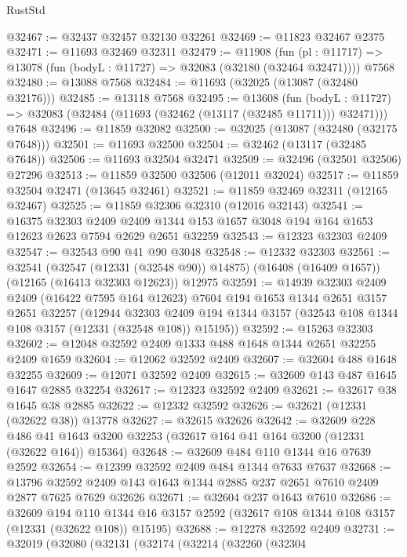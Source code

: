 \begin{lexlean}{RustStd}
\begin{coremodule}
@32467 := @32437 @32457 @32130 @32261
@32469 := @11823 @32467 @2375
@32471 := @11693 @32469 @32311
@32479 := @11908
    (fun (pl : @11717) => @13078 (fun (bodyL : @11727) => @32083 (@32180 (@32464 @32471))))
    @7568
@32480 := @13088 @7568
@32484 := @11693 (@32025 (@13087 (@32480 @32176)))
@32485 := @13118 @7568
@32495 := @13608
    (fun (bodyL : @11727) => @32083 (@32484 (@11693 (@32462 (@13117 (@32485 @11711))) @32471)))
    @7648
@32496 := @11859 @32082
@32500 := @32025 (@13087 (@32480 (@32175 @7648)))
@32501 := @11693 @32500
@32504 := @32462 (@13117 (@32485 @7648))
@32506 := @11693 @32504 @32471
@32509 := @32496 (@32501 @32506) @27296
@32513 := @11859 @32500 @32506 (@12011 @32024)
@32517 := @11859 @32504 @32471 (@13645 @32461)
@32521 := @11859 @32469 @32311 (@12165 @32467)
@32525 := @11859 @32306 @32310 (@12016 @32143)
@32541 := @16375
    @32303
    @2409
    @2409
    @1344
    @153
    @1657
    @3048
    @194
    @164
    @1653
    @12623
    @2623
    @7594
    @2629
    @2651
    @32259
@32543 := @12323 @32303 @2409
@32547 := @32543 @90 @41 @90 @3048
@32548 := @12332 @32303
@32561 := @32541
    (@32547 (@12331 (@32548 @90)) @14875)
    (@16408 (@16409 @1657))
    (@12165 (@16413 @32303 @12623))
    @12975
@32591 := @14939
    @32303
    @2409
    @2409
    (@16422 @7595 @164 @12623)
    @7604
    @194
    @1653
    @1344
    @2651
    @3157
    @2651
    @32257
    (@12944
      @32303
      @2409
      @194
      @1344
      @3157
      (@32543 @108 @1344 @108 @3157 (@12331 (@32548 @108)) @15195))
@32592 := @15263 @32303
@32602 := @12048 @32592 @2409 @1333 @488 @1648 @1344 @2651 @32255 @2409 @1659
@32604 := @12062 @32592 @2409
@32607 := @32604 @488 @1648 @32255
@32609 := @12071 @32592 @2409
@32615 := @32609 @143 @487 @1645 @1647 @2885 @32254
@32617 := @12323 @32592 @2409
@32621 := @32617 @38 @1645 @38 @2885
@32622 := @12332 @32592
@32626 := @32621 (@12331 (@32622 @38)) @13778
@32627 := @32615 @32626
@32642 := @32609
    @228
    @486
    @41
    @1643
    @3200
    @32253
    (@32617 @164 @41 @164 @3200 (@12331 (@32622 @164)) @15364)
@32648 := @32609 @484 @110 @1344 @16 @7639 @2592
@32654 := @12399 @32592 @2409 @484 @1344 @7633 @7637
@32668 := @13796 @32592 @2409 @143 @1643 @1344 @2885 @237 @2651 @7610 @2409 @2877 @7625 @7629 @32626
@32671 := @32604 @237 @1643 @7610
@32686 := @32609
    @194
    @110
    @1344
    @16
    @3157
    @2592
    (@32617 @108 @1344 @108 @3157 (@12331 (@32622 @108)) @15195)
@32688 := @12278 @32592 @2409
@32731 := @32019
    (@32080
      (@32131
        (@32174
          (@32214
            (@32260
              (@32304

\end{coremodule}
\end{lexlean}
